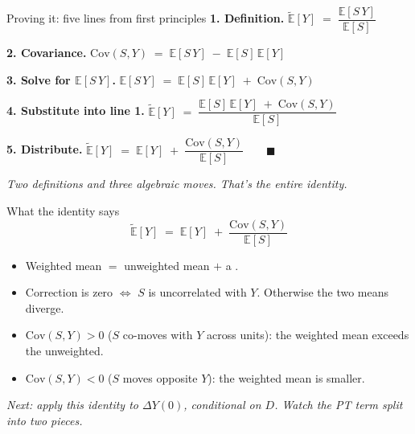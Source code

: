 \documentclass[aspectratio=169,11pt]{beamer}
\begin{document}
\begin{frame}{Proving it: five lines from first principles}
\footnotesize
\vspace{0.2em}
\textbf{1. Definition.} \quad $\widetilde{\mathbb{E}}[Y] \;=\; \dfrac{\mathbb{E}[S\, Y]}{\mathbb{E}[S]}$
\vspace{0.3em}

\textbf{2. Covariance.} \quad $\mathrm{Cov}(S, Y) \;=\; \mathbb{E}[S\, Y] \;-\; \mathbb{E}[S]\,\mathbb{E}[Y]$
\vspace{0.3em}

\textbf{3. Solve for $\mathbb{E}[S\, Y]$.} \quad $\mathbb{E}[S\, Y] \;=\; \mathbb{E}[S]\,\mathbb{E}[Y] \;+\; \mathrm{Cov}(S, Y)$
\vspace{0.3em}

\textbf{4. Substitute into line 1.} \quad $\widetilde{\mathbb{E}}[Y] \;=\; \dfrac{\mathbb{E}[S]\,\mathbb{E}[Y] \;+\; \mathrm{Cov}(S, Y)}{\mathbb{E}[S]}$
\vspace{0.3em}

\textbf{5. Distribute.} \quad $\widetilde{\mathbb{E}}[Y] \;=\; \mathbb{E}[Y] \;+\; \dfrac{\mathrm{Cov}(S, Y)}{\mathbb{E}[S]} \qquad \blacksquare$
\vspace{0.4em}

\normalsize
\begin{center}
\color{warmgray}\itshape\small
Two definitions and three algebraic moves. That's the entire identity.
\end{center}
\end{frame}

\begin{frame}{What the identity says}
\vspace{0.5em}
\[
\widetilde{\mathbb{E}}[Y] \;=\; \mathbb{E}[Y] \;+\; \frac{\mathrm{Cov}(S, Y)}{\mathbb{E}[S]}
\]
\vspace{0.1em}
\begin{itemize}
  \item Weighted mean $=$ unweighted mean $+$ a .
  \item Correction is zero $\iff$ $S$ is uncorrelated with $Y$. Otherwise the two means diverge.
  \item $\mathrm{Cov}(S, Y) > 0$ ($S$ co-moves with $Y$ across units): the weighted mean exceeds the unweighted.
  \item $\mathrm{Cov}(S, Y) < 0$ ($S$ moves opposite $Y$): the weighted mean is smaller.
\end{itemize}
\vspace{0.5em}
\begin{center}
\small\color{warmgray}\itshape
Next: apply this identity to $\Delta Y(0)$, conditional on $D$. Watch the PT term split into two pieces.
\end{center}
\end{frame}
\end{document}
